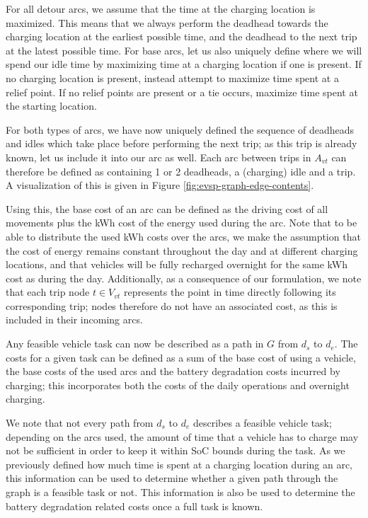 \documentclass[]{article}
\begin{document}
For all detour arcs, we assume that the time at the charging location is maximized. This means that we always perform the deadhead towards the charging location at the earliest possible time, and the deadhead to the next trip at the latest possible time. For base arcs, let us also uniquely define where we will spend our idle time by maximizing time at a charging location if one is present. If no charging location is present, instead attempt to maximize time spent at a relief point. If no relief points are present or a tie occurs, maximize time spent at the starting location. 

For both types of arcs, we have now uniquely defined the sequence of deadheads and idles which take place before performing the next trip; as this trip is already known, let us include it into our arc as well. Each arc between trips in $A_{vt}$ can therefore be defined as containing 1 or 2 deadheads, a (charging) idle and a trip. A visualization of this is given in Figure \ref{fig:evsp-graph-edge-contents}. 

Using this, the base cost of an arc can be defined as the driving cost of all movements plus the kWh cost of the energy used during the arc. Note that to be able to distribute the used kWh costs over the arcs, we make the assumption that the cost of energy remains constant throughout the day and at different charging locations, and that vehicles will be fully recharged overnight for the same kWh cost as during the day. Additionally, as a consequence of our formulation, we note that each trip node $t \in V_{vt}$ represents the point in time directly following its corresponding trip; nodes therefore do not have an associated cost, as this is included in their incoming arcs. 

Any feasible vehicle task can now be described as a path in $G$ from $d_s$ to $d_e$. The costs for a given task can be defined as a sum of the base cost of using a vehicle, the base costs of the used arcs and the battery degradation costs incurred by charging; this incorporates both the costs of the daily operations and overnight charging.

We note that not every path from $d_s$ to $d_e$ describes a feasible vehicle task; depending on the arcs used, the amount of time that a vehicle has to charge may not be sufficient in order to keep it within SoC bounds during the task. As we previously defined how much time is spent at a charging location during an arc, this information can be used to determine whether a given path through the graph is a feasible task or not. This information is also be used to determine the battery degradation related costs once a full task is known.
\end{document}
